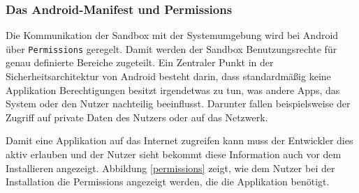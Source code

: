 \subsubsection{Das Android-Manifest und Permissions}
Die Kommunikation der Sandbox mit der Systemumgebung wird bei Android über \verb+Permissions+ geregelt. Damit werden der Sandbox Benutzungsrechte für genau definierte Bereiche zugeteilt. 
Ein Zentraler Punkt in der Sicherheitsarchitektur von Android besteht darin, dass standardmäßig keine Applikation Berechtigungen besitzt irgendetwas zu tun, was andere Apps, das System oder den Nutzer nachteilig beeinflusst. Darunter fallen beispielsweise der Zugriff auf private Daten des Nutzers oder auf das Netzwerk.

Damit eine Applikation auf das Internet zugreifen kann muss der Entwickler dies aktiv erlauben und der Nutzer sieht bekommt diese Information auch vor dem Installieren angezeigt. Abbildung \ref{permissions} zeigt, wie dem Nutzer bei der Installation die Permissions angezeigt werden, die die Applikation benötigt. 

